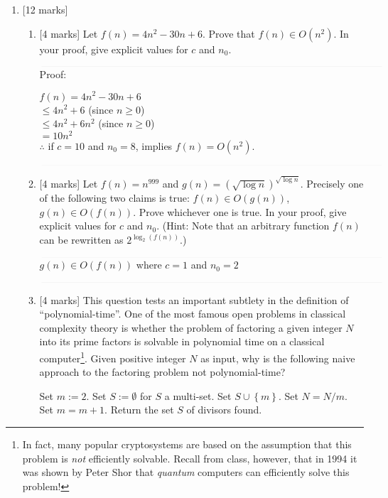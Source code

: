 \documentclass{article}
\newcommand{\set}[1]{{\left\{#1\right\}}}    %
\begin{document}
\begin{enumerate}
    \item {[12 marks]} \begin{enumerate}
        \item {[4 marks]} Let $f(n)=4n^2-30n+6$. Prove that $f(n)\in O(n^2)$. In your proof, give explicit values for $c$ and $n_0$.

            $\textcolor[RGB]{220,220,220}{\rule{\linewidth}{0.2pt}}$
            Proof:

            $f(n)=4n^2-30n+6$ \\
            $\leq 4n^2+6$ (since $n \geq 0$) \\
            $\leq 4n^2+6n^2$ (since $n \geq 0$)\\
            $= 10n^2$\\
            $\therefore$ if $c = 10$ and $n_0=8$, implies $f(n)=O(n^2)$.

            $\textcolor[RGB]{220,220,220}{\rule{\linewidth}{0.2pt}}$

        \item {[4 marks]} Let $f(n)=n^{999}$ and $g(n)=(\sqrt{\log n})^{\sqrt{\log n}}$. Precisely one of the following two claims is true: $f(n)\in O(g(n))$,  $g(n)\in O(f(n))$. Prove whichever one is true. In your proof, give explicit values for $c$ and $n_0$. (Hint: Note that an arbitrary function $f(n)$ can be rewritten as $2^{\log_2(f(n))}$.)

            $\textcolor[RGB]{220,220,220}{\rule{\linewidth}{0.2pt}}$
            $g(n)\in O(f(n))$ where $c=1$ and $n_0 = 2$

            $\textcolor[RGB]{220,220,220}{\rule{\linewidth}{0.2pt}}$

        \item {[4 marks]} This question tests an important subtlety in the definition of ``polynomial-time''.
             One of the most famous open problems in classical complexity theory is whether the problem of factoring a given integer $N$ into its prime factors is solvable in polynomial time on a classical computer\footnote{In fact, many popular cryptosystems are based on the assumption that this problem is \emph{not} efficiently solvable. Recall from class, however, that in 1994 it was shown by Peter Shor that \emph{quantum} computers can efficiently solve this problem!}. Given positive integer $N$ as input, why is the following naive approach to the factoring problem not polynomial-time?
                \begin{algorithmic}[1]
            \State Set $m := 2$.
            \State Set $S := \emptyset$ for $S$ a multi-set.
                    \State Set $S\cup \set{m}$.
                    \State Set $N=N/m$.
                \Else
                    \State Set $m=m+1$.
                \EndIf
            \EndWhile
            \State Return the set $S$ of divisors found.
\end{algorithmic}


\end{enumerate}
\end{enumerate}
\end{document}
